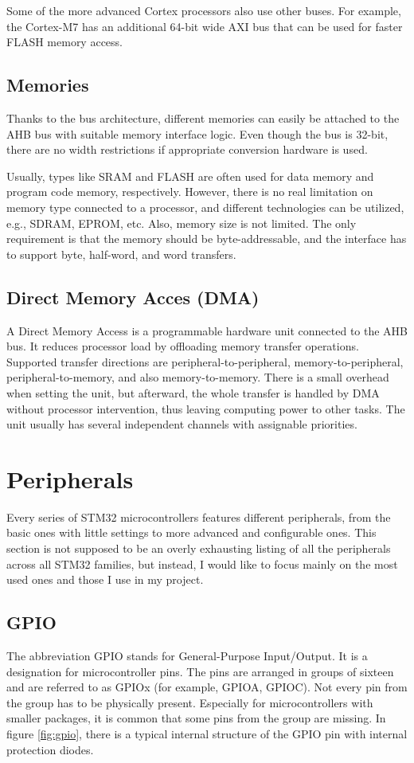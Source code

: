 Some of the more advanced Cortex processors also use other buses. For example, the Cortex-M7 has an additional 64-bit wide AXI bus that can be used for faster FLASH memory access. 

	\subsection{Memories}
	\label{sub:memories}
Thanks to the bus architecture, different memories can easily be attached to the AHB bus with suitable memory interface logic. Even though the bus is 32-bit, there are no width restrictions if appropriate conversion hardware is used.

Usually, types like SRAM and FLASH are often used for data memory and program code memory, respectively. However, there is no real limitation on memory type connected to a processor, and different technologies can be utilized, e.g., SDRAM, EPROM, etc. Also, memory size is not limited. The only requirement is that the memory should be byte-addressable, and the interface has to support byte, half-word, and word transfers.

	\subsection{Direct Memory Acces (DMA)}
	\label{sub:dma}
A Direct Memory Access is a programmable hardware unit connected to the AHB bus. It reduces processor load by offloading memory transfer operations. Supported transfer directions are peripheral-to-peripheral, memory-to-peripheral, peripheral-to-memory, and also memory-to-memory. There is a small overhead when setting the unit, but afterward, the whole transfer is handled by DMA without processor intervention, thus leaving computing power to other tasks. The unit usually has several independent channels with assignable priorities.


\section{Peripherals}
\label{sec:stm_periph}
Every series of STM32 microcontrollers features different peripherals, from the basic ones with little settings to more advanced and configurable ones. This section is not supposed to be an overly exhausting listing of all the peripherals across all STM32 families, but instead, I would like to focus mainly on the most used ones and those I use in my project.

	\subsection{GPIO}
	\label{sub:gpio}
The abbreviation GPIO stands for General-Purpose Input/Output. It is a designation for microcontroller pins. The pins are arranged in groups of sixteen and are referred to as GPIOx (for example, GPIOA, GPIOC). Not every pin from the group has to be physically present. Especially for microcontrollers with smaller packages, it is common that some pins from the group are missing. In figure \ref{fig:gpio}, there is a typical internal structure of the GPIO pin with internal protection diodes.

